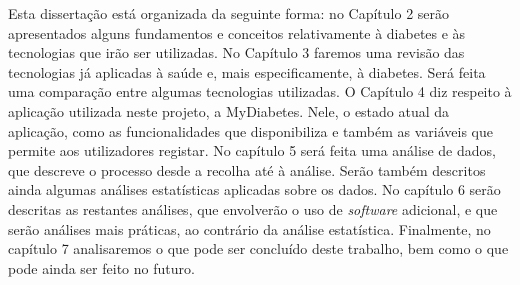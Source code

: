 Esta dissertação está organizada da seguinte forma: no Capítulo 2 serão apresentados alguns fundamentos e conceitos relativamente à diabetes e às tecnologias que irão ser utilizadas.
No Capítulo 3 faremos uma revisão das tecnologias já aplicadas à saúde e, mais especificamente, à diabetes. Será feita uma comparação entre algumas tecnologias utilizadas.
O Capítulo 4 diz respeito à aplicação utilizada neste projeto, a MyDiabetes. Nele, o estado atual da aplicação, como as funcionalidades que disponibiliza e também as variáveis que permite aos utilizadores registar.
No capítulo 5 será feita uma análise de dados, que descreve o processo desde a recolha até à análise. Serão também descritos ainda algumas análises estatísticas aplicadas sobre os dados.
No capítulo 6 serão descritas as restantes análises, que envolverão o uso de \textit{software} adicional, e que serão análises mais práticas, ao contrário da análise estatística.
Finalmente, no capítulo 7 analisaremos o que pode ser concluído deste trabalho, bem como o que pode ainda ser feito no futuro. 






